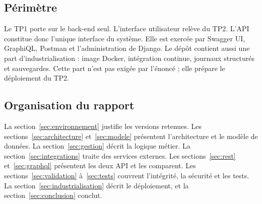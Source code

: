 \subsection{Périmètre}

Le TP1 porte sur le back-end seul. L'interface utilisateur relève du TP2. L'API constitue donc l'unique interface du système. Elle est exercée par Swagger UI, GraphiQL, Postman et l'administration de Django. Le dépôt contient aussi une part d'industrialisation : image Docker, intégration continue, journaux structurés et sauvegardes. Cette part n'est pas exigée par l'énoncé ; elle prépare le déploiement du TP2.

\subsection{Organisation du rapport}

La section~\ref{sec:environnement} justifie les versions retenues. Les sections~\ref{sec:architecture} et~\ref{sec:modele} présentent l'architecture et le modèle de données. La section~\ref{sec:gestion} décrit la logique métier. La section~\ref{sec:integrations} traite des services externes. Les sections~\ref{sec:rest} et~\ref{sec:graphql} présentent les deux API et les comparent. Les sections~\ref{sec:validation} à~\ref{sec:tests} couvrent l'intégrité, la sécurité et les tests. La section~\ref{sec:industrialisation} décrit le déploiement, et la section~\ref{sec:conclusion} conclut.
